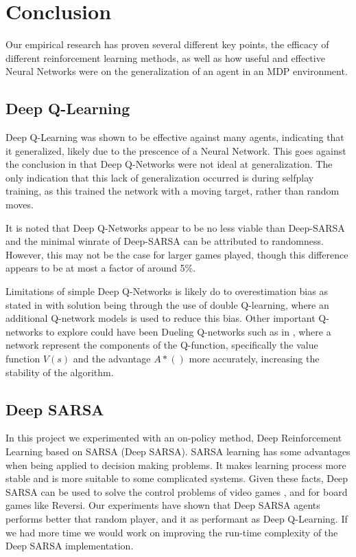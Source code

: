 \section{Conclusion}
Our empirical research has proven several different key points, the efficacy of different reinforcement learning methods, as well as how useful and effective Neural Networks were on the generalization of an agent in an MDP environment.
\subsection{Deep Q-Learning}
Deep Q-Learning was shown to be effective against many agents, indicating that it generalized, likely due to the prescence of a Neural Network. This goes against the conclusion in \citet{ree13} that Deep Q-Networks were not ideal at generalization. The only indication that this lack of generalization occurred is during selfplay training, as this trained the network with a moving target, rather than random moves.

It is noted that Deep Q-Networks appear to be no less viable than Deep-SARSA and the minimal winrate of Deep-SARSA can be attributed to randomness. However, this may not be the case for larger games played, though this difference appears to be at most a factor of around 5\%.

Limitations of simple Deep Q-Networks is likely do to overestimation bias as stated in \citet{8939117} with solution being through the use of double Q-learning, where an additional Q-network models is used to reduce this bias. Other important Q-networks to explore could have been Dueling Q-networks such as in \citet{DBLP:journals/corr/abs-2106-14642}, where a network represent the components of the Q-function, specifically the value function $V(s)$ and the advantage $A*()$ more accurately, increasing the stability of the algorithm.

\subsection{Deep SARSA}
In this project we experimented with an on-policy method, Deep Reinforcement Learning based on SARSA (Deep SARSA). SARSA learning has some advantages when being applied to decision making problems. It makes learning process more stable and is more suitable to some complicated systems. Given these facts,  Deep SARSA can be used to solve the control problems of video games \cite{7849837} , and for board games like Reversi. Our experiments have shown that Deep SARSA agents performs better that random player, and it as performant as Deep Q-Learning. If we had more time we would work on improving the run-time complexity of the Deep SARSA implementation.